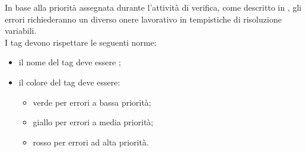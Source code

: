 In base alla priorità assegnata durante l'attività di verifica, come descritto in \PianoDiQualifica, gli errori richiederanno un diverso onere lavorativo in tempistiche di risoluzione variabili.\\
I tag devono rispettare le seguenti norme:
\begin{itemize}
	\item il nome del tag deve essere ;
	\item il colore del tag deve essere:
	\begin{itemize}
		\item verde per errori a bassa priorità;
		\item giallo per errori a media priorità;
		\item rosso per errori ad alta priorità.
	\end{itemize}
\end{itemize}
